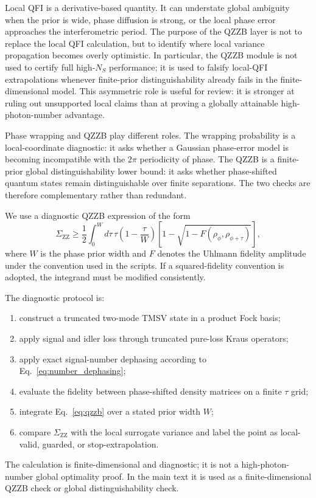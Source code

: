 \documentclass[a4paper,11pt]{article}
\numberwithin{equation}{section}
\begin{document}
Local QFI is a derivative-based quantity. It can understate global ambiguity when the prior is wide, phase diffusion is strong, or the local phase error approaches the interferometric period. The purpose of the QZZB layer is not to replace the local QFI calculation, but to identify where local variance propagation becomes overly optimistic. In particular, the QZZB module is not used to certify full high-$N_S$ performance; it is used to falsify local-QFI extrapolations whenever finite-prior distinguishability already fails in the finite-dimensional model. This asymmetric role is useful for review: it is stronger at ruling out unsupported local claims than at proving a globally attainable high-photon-number advantage.

Phase wrapping and QZZB play different roles. The wrapping probability is a local-coordinate diagnostic: it asks whether a Gaussian phase-error model is becoming incompatible with the $2\pi$ periodicity of phase. The QZZB is a finite-prior global distinguishability lower bound: it asks whether phase-shifted quantum states remain distinguishable over finite separations. The two checks are therefore complementary rather than redundant.

We use a diagnostic QZZB expression of the form
\begin{equation}
\Sigma_{\mathrm{ZZ}} \ge \frac{1}{2}\int_0^W d\tau\,\tau\left(1-\frac{\tau}{W}\right)
\left[1-\sqrt{1-F(\rho_\phi,\rho_{\phi+\tau})}\right],
\label{eq:qzzb}
\end{equation}
where $W$ is the phase prior width and $F$ denotes the Uhlmann fidelity amplitude under the convention used in the scripts. If a squared-fidelity convention is adopted, the integrand must be modified consistently.

The diagnostic protocol is:
\begin{enumerate}[label=(\alph*)]
  \item construct a truncated two-mode TMSV state in a product Fock basis;
  \item apply signal and idler loss through truncated pure-loss Kraus operators;
  \item apply exact signal-number dephasing according to Eq.~\eqref{eq:number_dephasing};
  \item evaluate the fidelity between phase-shifted density matrices on a finite $\tau$ grid;
  \item integrate Eq.~\eqref{eq:qzzb} over a stated prior width $W$;
  \item compare $\Sigma_{\mathrm{ZZ}}$ with the local surrogate variance and label the point as local-valid, guarded, or stop-extrapolation.
\end{enumerate}
The calculation is finite-dimensional and diagnostic; it is not a high-photon-number global optimality proof. In the main text it is used as a finite-dimensional QZZB check or global distinguishability check.
\end{document}
